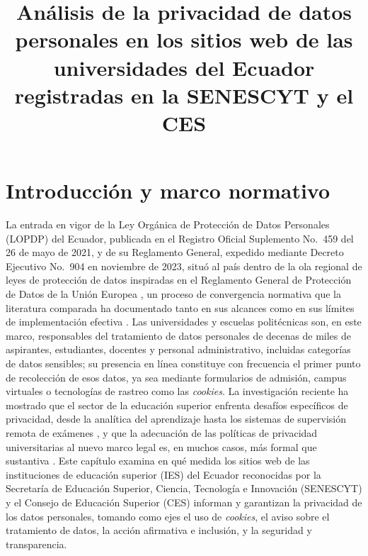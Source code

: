 \documentclass[11pt,a4paper]{article}
\title{\vspace{-1.2cm}\Large\textbf{An\'alisis de la privacidad de datos personales en los sitios web de las universidades del Ecuador registradas en la SENESCYT y el CES}}
\author{}
\date{}
\begin{document}
\maketitle
\vspace{-1.5cm}

\section{Introducci\'on y marco normativo}
La entrada en vigor de la Ley Org\'anica de Protecci\'on de Datos Personales (LOPDP) del Ecuador, publicada en el Registro Oficial Suplemento No.~459 del 26 de mayo de 2021, y de su Reglamento General, expedido mediante Decreto Ejecutivo No.~904 en noviembre de 2023, situ\'o al pa\'is dentro de la ola regional de leyes de protecci\'on de datos inspiradas en el Reglamento General de Protecci\'on de Datos de la Uni\'on Europea \citep{gdpr2016,lopdp2021,reglamentolopdp2023}, un proceso de convergencia normativa que la literatura comparada ha documentado tanto en sus alcances como en sus l\'imites de implementaci\'on efectiva \citep{carrillo2022follow,chavarriamora2025lack}.
Las universidades y escuelas polit\'ecnicas son, en este marco, responsables del tratamiento de datos personales de decenas de miles de aspirantes, estudiantes, docentes y personal administrativo, incluidas categor\'ias de datos sensibles; su presencia en l\'inea constituye con frecuencia el primer punto de recolecci\'on de esos datos, ya sea mediante formularios de admisi\'on, campus virtuales o tecnolog\'ias de rastreo como las \emph{cookies}.
La investigaci\'on reciente ha mostrado que el sector de la educaci\'on superior enfrenta desaf\'ios espec\'ificos de privacidad, desde la anal\'itica del aprendizaje hasta los sistemas de supervisi\'on remota de ex\'amenes \citep{liu2023understanding,mutimukwe2025privacy}, y que la adecuaci\'on de las pol\'iticas de privacidad universitarias al nuevo marco legal es, en muchos casos, m\'as formal que sustantiva \citep{munot2025compliance}.
Este cap\'itulo examina en qu\'e medida los sitios web de las instituciones de educaci\'on superior (IES) del Ecuador reconocidas por la Secretar\'ia de Educaci\'on Superior, Ciencia, Tecnolog\'ia e Innovaci\'on (SENESCYT) y el Consejo de Educaci\'on Superior (CES) informan y garantizan la privacidad de los datos personales, tomando como ejes el uso de \emph{cookies}, el aviso sobre el tratamiento de datos, la acci\'on afirmativa e inclusi\'on, y la seguridad y transparencia.
\end{document}

